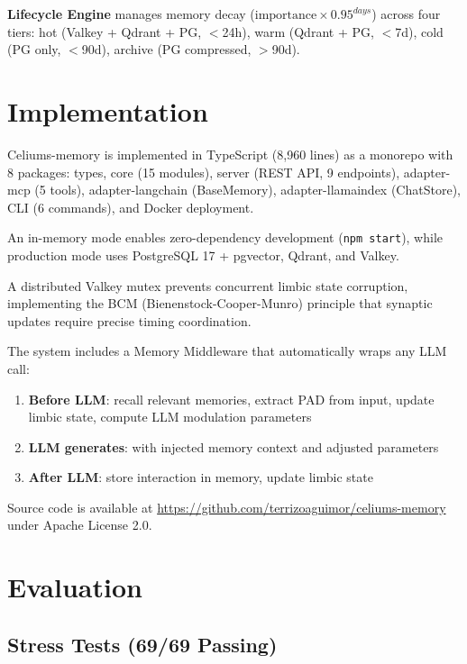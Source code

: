 \documentclass[journal,twoside]{IEEEtran}
\begin{document}
\textbf{Lifecycle Engine} manages memory decay ($\text{importance} \times 0.95^{days}$) across four tiers: hot (Valkey + Qdrant + PG, $<$24h), warm (Qdrant + PG, $<$7d), cold (PG only, $<$90d), archive (PG compressed, $>$90d).

\section{Implementation}

Celiums-memory is implemented in TypeScript (8,960 lines) as a monorepo with 8 packages: types, core (15 modules), server (REST API, 9 endpoints), adapter-mcp (5 tools), adapter-langchain (BaseMemory), adapter-llamaindex (ChatStore), CLI (6 commands), and Docker deployment.

An in-memory mode enables zero-dependency development (\texttt{npm start}), while production mode uses PostgreSQL 17 + pgvector, Qdrant, and Valkey.

A distributed Valkey mutex prevents concurrent limbic state corruption, implementing the BCM (Bienenstock-Cooper-Munro) principle that synaptic updates require precise timing coordination.

The system includes a Memory Middleware that automatically wraps any LLM call:
\begin{enumerate}
    \item \textbf{Before LLM}: recall relevant memories, extract PAD from input, update limbic state, compute LLM modulation parameters
    \item \textbf{LLM generates}: with injected memory context and adjusted parameters
    \item \textbf{After LLM}: store interaction in memory, update limbic state
\end{enumerate}

Source code is available at \url{https://github.com/terrizoaguimor/celiums-memory} under Apache License 2.0.

\section{Evaluation}

\subsection{Stress Tests (69/69 Passing)}
\end{document}
